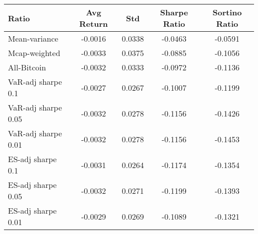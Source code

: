 \begin{tabular}{lcccc}
\toprule
Ratio & Avg Return & Std & Sharpe Ratio & Sortino Ratio\\
\midrule
Mean-variance & -0.0016 & 0.0338 & -0.0463 & -0.0591\\
Mcap-weighted & -0.0033 & 0.0375 & -0.0885 & -0.1056\\
All-Bitcoin & -0.0032 & 0.0333 & -0.0972 & -0.1136\\
VaR-adj sharpe 0.1 & -0.0027 & 0.0267 & -0.1007 & -0.1199\\
VaR-adj sharpe 0.05 & -0.0032 & 0.0278 & -0.1156 & -0.1426\\
VaR-adj sharpe 0.01 & -0.0032 & 0.0278 & -0.1156 & -0.1453\\
ES-adj sharpe 0.1 & -0.0031 & 0.0264 & -0.1174 & -0.1354\\
ES-adj sharpe 0.05 & -0.0032 & 0.0271 & -0.1199 & -0.1393\\
ES-adj sharpe 0.01 & -0.0029 & 0.0269 & -0.1089 & -0.1321\\
\bottomrule
\end{tabular}
